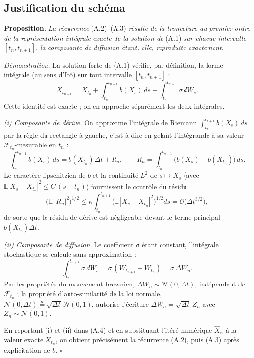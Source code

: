 \subsection*{Justification du schéma}

\noindent\textbf{Proposition.} \textit{La récurrence} (A.2)--(A.3) \textit{résulte de la troncature au premier ordre de la représentation intégrale exacte de la solution de} (A.1) \textit{sur chaque intervalle} $[t_n, t_{n+1}]$, \textit{la composante de diffusion étant, elle, reproduite exactement.}

\medskip
\noindent\textit{Démonstration.}
La solution forte de (A.1) vérifie, par définition, la forme intégrale (au sens d'Itô) sur tout intervalle $[t_n, t_{n+1}]$ :
\begin{equation}
    X_{t_{n+1}} = X_{t_n} + \int_{t_n}^{t_{n+1}} b(X_s)\,ds + \int_{t_n}^{t_{n+1}} \sigma\,dW_s.
    \tag{A.4}
\end{equation}
Cette identité est exacte ; on en approche séparément les deux intégrales.

\medskip
\noindent\textit{(i) Composante de dérive.} On approxime l'intégrale de Riemann $\int_{t_n}^{t_{n+1}} b(X_s)\,ds$ par la règle du rectangle à gauche, c'est-à-dire en gelant l'intégrande à sa valeur $\mathcal{F}_{t_n}$-mesurable en $t_n$ :
\[
    \int_{t_n}^{t_{n+1}} b(X_s)\,ds = b(X_{t_n})\,\Delta t + R_n, \qquad
    R_n = \int_{t_n}^{t_{n+1}} \bigl(b(X_s) - b(X_{t_n})\bigr)\,ds.
\]
Le caractère lipschitzien de $b$ et la continuité $L^2$ de $s \mapsto X_s$ (avec $\mathbb{E}|X_s - X_{t_n}|^2 \le C\,(s - t_n)$) fournissent le contrôle du résidu
\[
    \bigl(\mathbb{E}\,|R_n|^2\bigr)^{1/2}
    \le \kappa \int_{t_n}^{t_{n+1}} \bigl(\mathbb{E}\,|X_s - X_{t_n}|^2\bigr)^{1/2} ds
    = \mathcal{O}\!\bigl(\Delta t^{3/2}\bigr),
\]
de sorte que le résidu de dérive est négligeable devant le terme principal $b(X_{t_n})\Delta t$.

\medskip
\noindent\textit{(ii) Composante de diffusion.} Le coefficient $\sigma$ étant constant, l'intégrale stochastique se calcule sans approximation :
\[
    \int_{t_n}^{t_{n+1}} \sigma\,dW_s = \sigma\,(W_{t_{n+1}} - W_{t_n}) = \sigma\,\Delta W_n.
\]
Par les propriétés du mouvement brownien, $\Delta W_n \sim \mathcal{N}(0,\Delta t)$, indépendant de $\mathcal{F}_{t_n}$ ; la propriété d'auto-similarité de la loi normale, $\mathcal{N}(0,\Delta t) \overset{d}{=} \sqrt{\Delta t}\,\mathcal{N}(0,1)$, autorise l'écriture $\Delta W_n = \sqrt{\Delta t}\,Z_n$ avec $Z_n \sim \mathcal{N}(0,1)$.

\medskip
En reportant (i) et (ii) dans (A.4) et en substituant l'itéré numérique $\widehat{X}_n$ à la valeur exacte $X_{t_n}$, on obtient précisément la récurrence (A.2), puis (A.3) après explicitation de $b$. \hfill$\square$